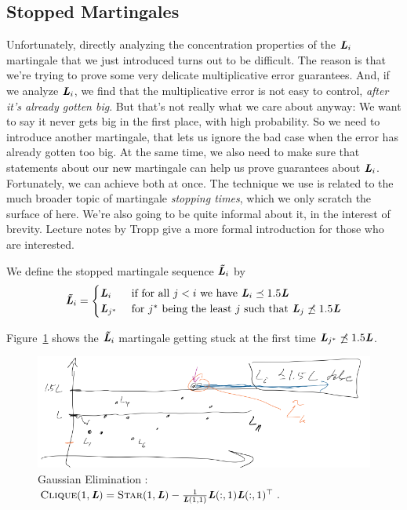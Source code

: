 \subsection{Stopped Martingales}
Unfortunately, directly analyzing the concentration properties of
the $\boldsymbol{\mathit{L}}_i$ martingale that we just introduced turns out to be
difficult.
The reason is that we're trying to prove some very delicate
multiplicative error guarantees.
And, if we analyze $\boldsymbol{\mathit{L}}_i$, we find that the multiplicative error is
not easy to control, \emph{after it's already gotten big}.
But that's not really what we care about anyway: We want to say it
never gets big in the first place, with high probability.
So we need to introduce another martingale, that lets us ignore the
bad case when the error has already gotten too big.
At the same time, we also need to make sure that statements about our
new martingale can help us prove guarantees about  $\boldsymbol{\mathit{L}}_i$.
Fortunately, we can achieve both at once.
The technique we use is related to the much broader topic of
martingale \emph{stopping times}, which we only scratch the surface of
here. We're also going to be quite informal about it, in the interest
of brevity.
Lecture notes by Tropp \cite{tropp19} give a more formal introduction for
those who are interested.



We define the stopped martingale sequence $\boldsymbol{\mathit{\tilde{L}}}_i$ by
\begin{equation}
  \label{eq:stoppedmartingale}
  \boldsymbol{\mathit{\tilde{L}}}_i
  =
  \begin{cases}
    \boldsymbol{\mathit{L}}_i & \text{ if for all } j < i \text{ we have }
       \boldsymbol{\mathit{L}}_i \preceq 1.5 \boldsymbol{\mathit{L}}
       \\
    \boldsymbol{\mathit{L}}_{j^*} & \text{ for } j^* \text{ being the least $j$ such that }  \boldsymbol{\mathit{L}}_{j} \not\preceq 1.5 \boldsymbol{\mathit{L}}
  \end{cases}
\end{equation}



Figure~\ref{fig:stopmart} shows the $\boldsymbol{\mathit{\tilde{L}}}_i$ martingale getting
stuck at the first time $\boldsymbol{\mathit{L}}_{j^*} \not\preceq 1.5 \boldsymbol{\mathit{L}}$.
\begin{figure}[H]
  \centering
  \includegraphics[width=1
  \textwidth]{fig/lec9_stoppedmartingale.png}
  \caption{Gaussian Elimination
    :
    $\textsc{Clique}\!\left({1,\boldsymbol{\mathit{L}}}\right) = \textsc{Star}\!\left({1,\boldsymbol{\mathit{L}}}\right) - \frac{1}{\boldsymbol{\mathit{L}}(1,1)} \boldsymbol{\mathit{L}}(:,1)
    \boldsymbol{\mathit{L}}(:,1)^{\top}$.}
      \label{fig:stopmart}
    \end{figure}

